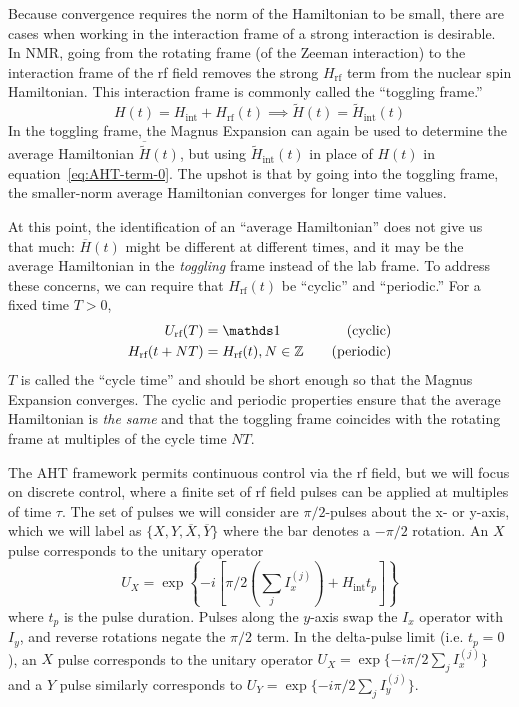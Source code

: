 Because convergence requires the norm of the Hamiltonian to be small, there are cases when working in the interaction frame of a strong interaction is desirable. In NMR, going from the rotating frame (of the Zeeman interaction) to the interaction frame of the rf field removes the strong $H_\text{rf}$ term from the nuclear spin Hamiltonian. This interaction frame is commonly called the ``toggling frame.''
\[
H(t) = H_{\text{int}} + H_{\text{rf}}(t) \implies \widetilde{H}(t) = \widetilde{H}_{\text{int}}(t)
\]
In the toggling frame, the Magnus Expansion can again be used to determine the average Hamiltonian $\overline{\widetilde{H}}(t)$, but using $\widetilde{H}_{\text{int}}(t)$ in place of $H(t)$ in equation~\ref{eq:AHT-term-0}. The upshot is that by going into the toggling frame, the smaller-norm average Hamiltonian converges for longer time values.

At this point, the identification of an ``average Hamiltonian'' does not give us that much: $\overline{H}(t)$ might be different at different times, and it may be the average Hamiltonian in the \emph{toggling} frame instead of the lab frame. To address these concerns, we can require that $H_\text{rf}(t)$ be ``cyclic'' and ``periodic.'' For a fixed time $T>0$,
\begin{align}\label{eq:AHT-constraints}
    U_{\text{rf}}(T) &= \identity & \quad \text{(cyclic)} \\
    H_{\text{rf}}(t + NT) &= H_{\text{rf}}(t), N \in \Z & \quad \text{(periodic)}
\end{align}
$T$ is called the ``cycle time'' and should be short enough so that the Magnus Expansion converges.
The cyclic and periodic properties ensure that the average Hamiltonian is \emph{the same} and that the toggling frame coincides with the rotating frame at multiples of the cycle time $NT$.

The AHT framework permits continuous control via the rf field, but we will focus on discrete control, where a finite set of rf field pulses can be applied at multiples of time $\tau$. The set of pulses we will consider are $\pi/2$-pulses about the x- or y-axis, which we will label as $\{ X, Y, \overline{X}, \overline{Y} \}$ where the bar denotes a $-\pi/2$ rotation. An $X$ pulse corresponds to the unitary operator
\begin{equation}\label{eq:X-pulse}
    U_X = \exp\left\{-i
        \left[
            \pi/2 \left(\sum_j I_x^{(j)}\right) + H_{\text{int}} t_p
        \right]
    \right\}
\end{equation}
where $t_p$ is the pulse duration. Pulses along the $y$-axis swap the $I_x$ operator with $I_y$, and reverse rotations negate the $\pi/2$ term. In the delta-pulse limit (i.e. $t_p = 0$), an $X$ pulse corresponds to the unitary operator $U_X = \exp\{-i \pi/2 \sum_j I_x^{(j)}\}$ and a $Y$ pulse similarly corresponds to $U_Y = \exp\{-i \pi/2 \sum_j I_y^{(j)}\}$.

